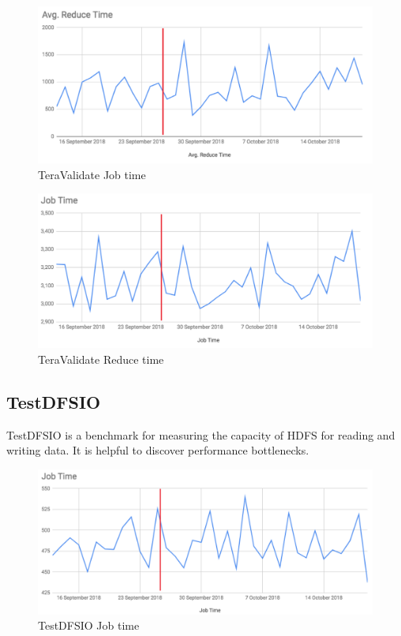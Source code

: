 \begin{figure}[H]
	\includegraphics[width=125mm, keepaspectratio]{figures/teravalidate_job.png}
	\centering
	\caption{TeraValidate Job time}
\end{figure}
\begin{figure}[H]
	\includegraphics[width=125mm, keepaspectratio]{figures/teravalidate_reduce.png}
	\centering
	\caption{TeraValidate Reduce time}
\end{figure}

\subsection{TestDFSIO}
TestDFSIO is a benchmark for measuring the capacity of HDFS for reading and writing data. It is helpful to discover performance bottlenecks.

\begin{figure}[H]
	\includegraphics[width=125mm, keepaspectratio]{figures/dfsio_job.png}
	\centering
	\caption{TestDFSIO Job time}
\end{figure}

